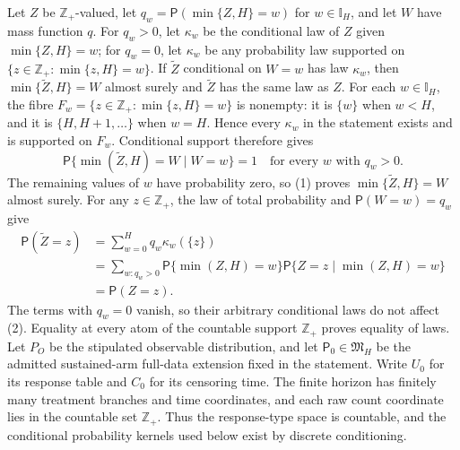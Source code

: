 Let \(Z\) be \(\mathbb Z_+\)-valued, let \(q_w=\mathsf P(\min\{Z,H\}=w)\) for \(w\in\mathbb I_H\), and let \(W\) have mass function \(q\). For \(q_w>0\), let \(\kappa_w\) be the conditional law of \(Z\) given \(\min\{Z,H\}=w\); for \(q_w=0\), let \(\kappa_w\) be any probability law supported on \(\{z\in\mathbb Z_+:\min\{z,H\}=w\}\). If \(\widetilde Z\) conditional on \(W=w\) has law \(\kappa_w\), then \(\min\{\widetilde Z,H\}=W\) almost surely and \(\widetilde Z\) has the same law as \(Z\).
For each \(w\in\mathbb I_H\), the fibre \(F_w=\{z\in\mathbb Z_+:\min\{z,H\}=w\}\) is nonempty: it is \(\{w\}\) when \(w<H\), and it is \(\{H,H+1,\ldots\}\) when \(w=H\). Hence every \(\kappa_w\) in the statement exists and is supported on \(F_w\). Conditional support therefore gives
\[
 \mathsf P\{\min(\widetilde Z,H)=W\mid W=w\}=1
 \quad\text{for every }w\text{ with }q_w>0.               \tag{1}
\]
The remaining values of \(w\) have probability zero, so (1) proves \(\min\{\widetilde Z,H\}=W\) almost surely. For any \(z\in\mathbb Z_+\), the law of total probability and \(\mathsf P(W=w)=q_w\) give
\[
 \begin{aligned}
 \mathsf P(\widetilde Z=z)
 &=\sum_{w=0}^{H}q_w\kappa_w(\{z\})\\
 &=\sum_{w:q_w>0}\mathsf P\{\min(Z,H)=w\}
      \mathsf P\{Z=z\mid\min(Z,H)=w\}\\
 &=\mathsf P(Z=z).
 \end{aligned}                                           \tag{2}
\]
The terms with \(q_w=0\) vanish, so their arbitrary conditional laws do not affect (2). Equality at every atom of the countable support \(\mathbb Z_+\) proves equality of laws.
Let \(P_O\) be the stipulated observable distribution, and let \(\mathsf P_0\in\mathfrak M_H\) be the admitted sustained-arm full-data extension fixed in the statement. Write \(U_0\) for its response table and \(C_0\) for its censoring time. The finite horizon has finitely many treatment branches and time coordinates, and each raw count coordinate lies in the countable set \(\mathbb Z_+\). Thus the response-type space is countable, and the conditional probability kernels used below exist by discrete conditioning.

